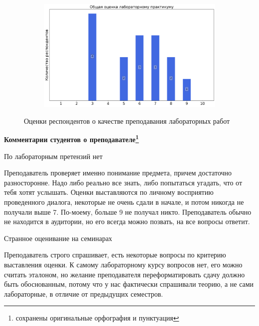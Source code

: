 \begin{figure}[H]
\begin{subfigure}[b]{0.45\textwidth}
			\end{subfigure}
			\begin{subfigure}[b]{0.45\textwidth}
				\centering
				\includegraphics[width=\textwidth]{images/3 course/Аналоговая электроника/labniks-marks-Бибиков А.М.-3.png}
			\end{subfigure}	
			\caption{Оценки респондентов о качестве преподавания лабораторных работ}
		\end{figure}

		\textbf{Комментарии студентов о преподавателе\protect\footnote{сохранены оригинальные орфография и пунктуация}}
            \begin{commentbox} 
                По лабораторным претензий нет  
            \end{commentbox} 
        
            \begin{commentbox} 
                Преподаватель проверяет именно понимание предмета, причем достаточно разносторонне. Надо либо реально все знать, либо попытаться угадать, что от тебя хотят услышать. Оценки выставляются по личному восприятию проведенного диалога, некоторые не очень сдали в начале, и потом никогда не получали выше 7. По-моему, больше 9 не получал никто. Преподаватель обычно не находится в аудитории, но его всегда можно позвать, на все вопросы ответит. 
            \end{commentbox} 
        
            \begin{commentbox} 
                Странное оценивание на семинарах 
            \end{commentbox} 
        
            \begin{commentbox} 
                Преподаватель строго спрашивает, есть некоторые вопросы по критерию выставления оценки. К самому лабораторному курсу вопросов нет, его можно считать эталоном, но желание преподавателя переформатировать сдачу должно быть обоснованным, потому что у нас фактически спрашивали теорию, а не сами лабораторные, в отличие от предыдущих семестров. 
            \end{commentbox} 
        

